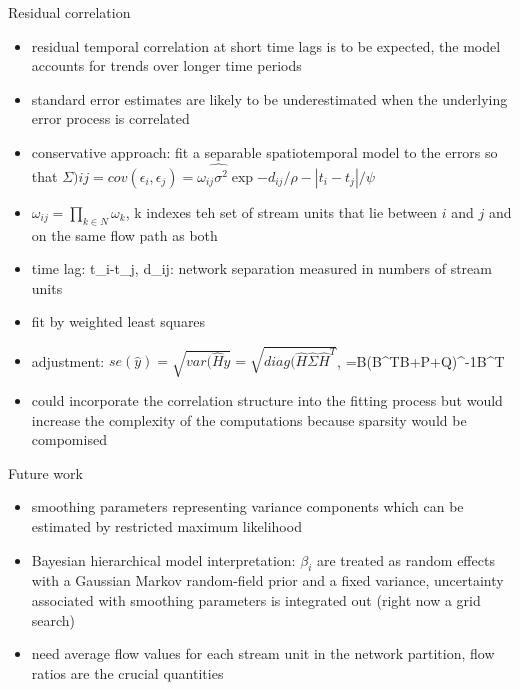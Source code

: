 \documentclass[12pt]{amsart}
\begin{document}
Residual correlation
\begin{itemize}
\item residual temporal correlation at short time lags is to be expected, the model accounts for trends over longer time periods
\item standard error estimates are likely to be underestimated when the underlying error process is correlated
\item conservative approach: fit a separable spatiotemporal model to the errors so that $\hat{\Sigma){ij}=cov(\epsilon_i,\epsilon_j)=\omega_{ij}\sigma^2 \exp{-d_{ij}/\rho-|t_i-t_j|/\psi}}$
\item $\omega_{ij}=\prod_{k\in N} \omega_k$, k indexes teh set of stream units that lie between $i$ and $j$ and on the same flow path as both
\item time lag: t_i-t_j, d_{ij}: network separation measured in numbers of stream units
\item fit by weighted least squares
\item adjustment: $se(\hat{y})=\sqrt{var(\hat{H}y}=\sqrt{diag(\hat{H}\hat{\Sigma}\hat{H}^T}$, =B(B^TB+P+Q)^{-1}B^T
\item could incorporate the correlation structure into the fitting process but would increase the complexity of the computations because sparsity would be compomised
\end{itemize}

Future work
\begin{itemize}

\item smoothing parameters representing variance components which can be estimated by restricted maximum likelihood
\item Bayesian hierarchical model interpretation: $\beta_i$ are treated as random effects with a Gaussian Markov random-field prior and a fixed variance, uncertainty associated with smoothing parameters is integrated out (right now a grid search)
\item need average flow values for each stream unit in the network partition, flow ratios are the crucial quantities
\end{itemize}
\end{document}

